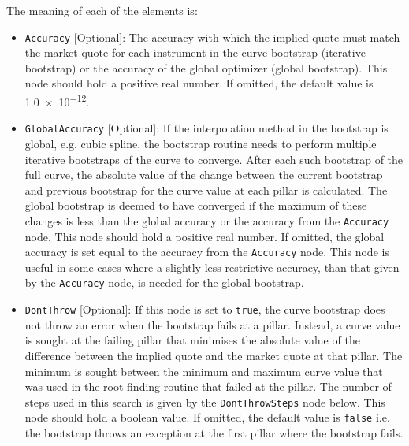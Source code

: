 The meaning of each of the elements is:
\begin{itemize}
\item \lstinline!Accuracy! [Optional]: The accuracy with which the implied quote must match the market quote for each
  instrument in the curve bootstrap (iterative bootstrap) or the accuracy of the global optimizer (global
  bootstrap). This node should hold a positive real number. If omitted, the default value is
  \num[scientific-notation=true]{1.0e-12}.

\item \lstinline!GlobalAccuracy! [Optional]:
If the interpolation method in the bootstrap is global, e.g. cubic spline, the bootstrap routine needs to perform multiple iterative bootstraps of the curve to converge. After each such bootstrap of the full curve, the absolute value of the change between the current bootstrap and previous bootstrap for the curve value at each pillar is calculated. The global bootstrap is deemed to have converged if the maximum of these changes is less than the global accuracy or the accuracy from the \lstinline!Accuracy! node. This node should hold a positive real number. If omitted, the global accuracy is set equal to the accuracy from the \lstinline!Accuracy! node. This node is useful in some cases where a slightly less restrictive accuracy, than that given by the \lstinline!Accuracy! node, is needed for the global bootstrap.

\item \lstinline!DontThrow! [Optional]:
If this node is set to \lstinline!true!, the curve bootstrap does not throw an error when the bootstrap fails at a pillar. Instead, a curve value is sought at the failing pillar that minimises the absolute value of the difference between the implied quote and the market quote at that pillar. The minimum is sought between the minimum and maximum curve value that was used in the root finding routine that failed at the pillar. The number of steps used in this search is given by the \lstinline!DontThrowSteps! node below. This node should hold a boolean value. If omitted, the default value is \lstinline!false! i.e. the bootstrap throws an exception at the first pillar where the bootstrap fails.


\end{itemize}
